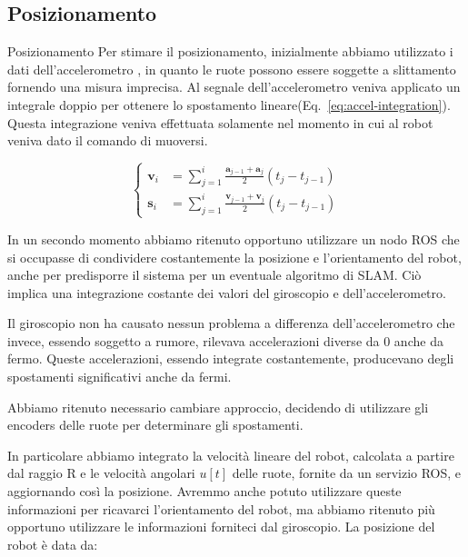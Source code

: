 \documentclass[10pt]{beamer}
\begin{document}
	\subsection{Posizionamento}\label{subsec:Posizionamento}
	\begin{frame}[allowframebreaks]{Posizionamento}
		Per stimare il posizionamento, inizialmente abbiamo utilizzato i dati dell'accelerometro
		\cite{positioning}, in quanto le ruote possono essere soggette a
		slittamento fornendo una misura imprecisa. Al segnale dell'accelerometro
		veniva applicato un integrale doppio per ottenere lo spostamento
		lineare(Eq.~\ref{eq:accel-integration}). Questa integrazione veniva effettuata solamente nel momento in cui al robot veniva dato il comando di muoversi.
		
		\begin{equation}\label{eq:accel-integration}
			\begin{cases}
				\textbf{v}_i & = \sum_{j=1}^{i} \frac{\textbf{a} _{j-1}+\textbf{a} _j}{2} \left( t_j-t_{j-1} \right) \\
				\textbf{s}_i & = \sum_{j=1}^{i} \frac{\textbf{v} _{j-1}+\textbf{v} _j}{2} \left( t_j-t_{j-1} \right) 
			\end{cases}
		\end{equation}
		
		In un secondo momento abbiamo ritenuto opportuno utilizzare un nodo ROS che
		si occupasse di condividere costantemente la posizione e l'orientamento del
		robot, anche per predisporre il sistema per un eventuale algoritmo di SLAM.
		Ciò implica una integrazione costante dei valori del giroscopio e
		dell'accelerometro. 
		
		Il giroscopio non ha causato nessun problema a differenza
		dell'accelerometro che invece, essendo soggetto a rumore, rilevava
		accelerazioni diverse da 0 anche da fermo. Queste accelerazioni, essendo
		integrate costantemente, producevano degli spostamenti significativi anche
		da fermi. 
		
		Abbiamo ritenuto necessario cambiare approccio, decidendo di utilizzare gli
		encoders delle ruote per determinare gli spostamenti. 
		
		In particolare abbiamo integrato la velocità lineare del robot, calcolata a
		partire dal raggio R e le velocità angolari $u[t]$ delle ruote, fornite da
		un servizio ROS, e aggiornando così la posizione. Avremmo anche potuto
		utilizzare queste informazioni per ricavarci l'orientamento del robot, ma
		abbiamo ritenuto più opportuno utilizzare le informazioni forniteci dal
		giroscopio. La posizione del robot è data da:
		

\end{frame}
\end{document}
